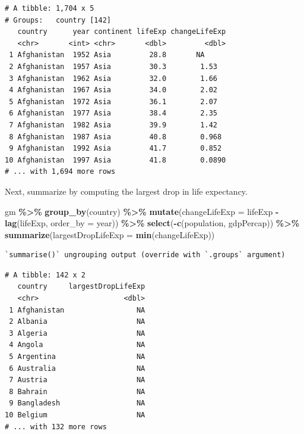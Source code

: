 \documentclass[
]{krantz}
\makeatletter
\newenvironment{Shaded}{\begin{snugshade}}{\end{snugshade}}
\newcommand{\DataTypeTok}[1]{\textcolor[rgb]{0.27,0.27,0.27}{#1}}
\newcommand{\KeywordTok}[1]{\textcolor[rgb]{0.27,0.27,0.27}{\textbf{#1}}}
\newcommand{\NormalTok}[1]{#1}
\newcommand{\OperatorTok}[1]{\textcolor[rgb]{0.43,0.43,0.43}{\textbf{#1}}}
\newcommand{\StringTok}[1]{\textcolor[rgb]{0.5,0.5,0.5}{#1}}
\newenvironment{kframe}{%
\medskip{}
\setlength{\fboxsep}{.8em}
 \def\at@end@of@kframe{}%
 \ifinner\ifhmode%
  \def\at@end@of@kframe{\end{minipage}}%
  \begin{minipage}{\columnwidth}%
 \fi\fi%
 \def\FrameCommand##1{\hskip\@totalleftmargin \hskip-\fboxsep
 \colorbox{shadecolor}{##1}\hskip-\fboxsep
     \hskip-\linewidth \hskip-\@totalleftmargin \hskip\columnwidth}%
 \MakeFramed {\advance\hsize-\width
   \@totalleftmargin\z@ \linewidth\hsize
   \@setminipage}}%
 {\par\unskip\endMakeFramed%
 \at@end@of@kframe}
\renewenvironment{Shaded}{\begin{kframe}}{\end{kframe}}
\makeatother
\begin{document}
\begin{verbatim}
# A tibble: 1,704 x 5
# Groups:   country [142]
   country      year continent lifeExp changeLifeExp
   <chr>       <int> <chr>       <dbl>         <dbl>
 1 Afghanistan  1952 Asia         28.8       NA     
 2 Afghanistan  1957 Asia         30.3        1.53  
 3 Afghanistan  1962 Asia         32.0        1.66  
 4 Afghanistan  1967 Asia         34.0        2.02  
 5 Afghanistan  1972 Asia         36.1        2.07  
 6 Afghanistan  1977 Asia         38.4        2.35  
 7 Afghanistan  1982 Asia         39.9        1.42  
 8 Afghanistan  1987 Asia         40.8        0.968 
 9 Afghanistan  1992 Asia         41.7        0.852 
10 Afghanistan  1997 Asia         41.8        0.0890
# ... with 1,694 more rows
\end{verbatim}

Next, summarize by computing the largest drop in life expectancy.

\begin{Shaded}
\begin{Highlighting}[]
\NormalTok{gm }\OperatorTok{\%\textgreater{}\%}\StringTok{ }
\StringTok{  }\KeywordTok{group\_by}\NormalTok{(country) }\OperatorTok{\%\textgreater{}\%}\StringTok{ }
\StringTok{  }\KeywordTok{mutate}\NormalTok{(}\DataTypeTok{changeLifeExp =}\NormalTok{ lifeExp }\OperatorTok{{-}}\StringTok{ }\KeywordTok{lag}\NormalTok{(lifeExp, }\DataTypeTok{order\_by =}\NormalTok{ year)) }\OperatorTok{\%\textgreater{}\%}\StringTok{ }
\StringTok{  }\KeywordTok{select}\NormalTok{(}\OperatorTok{{-}}\KeywordTok{c}\NormalTok{(population, gdpPercap)) }\OperatorTok{\%\textgreater{}\%}\StringTok{ }
\StringTok{  }\KeywordTok{summarize}\NormalTok{(}\DataTypeTok{largestDropLifeExp =} \KeywordTok{min}\NormalTok{(changeLifeExp))}
\end{Highlighting}
\end{Shaded}

\begin{verbatim}
`summarise()` ungrouping output (override with `.groups` argument)
\end{verbatim}

\begin{verbatim}
# A tibble: 142 x 2
   country     largestDropLifeExp
   <chr>                    <dbl>
 1 Afghanistan                 NA
 2 Albania                     NA
 3 Algeria                     NA
 4 Angola                      NA
 5 Argentina                   NA
 6 Australia                   NA
 7 Austria                     NA
 8 Bahrain                     NA
 9 Bangladesh                  NA
10 Belgium                     NA
# ... with 132 more rows
\end{verbatim}
\end{document}
